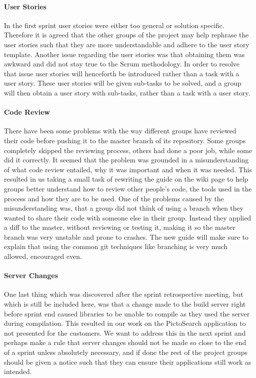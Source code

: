 \paragraph{User Stories} In the first sprint user stories were either too general or solution specific.
Therefore it is agreed that the other groups of the project may help rephrase the user stories such that they are more understandable and adhere to the user story template.
Another issue regarding the user stories was that obtaining them was awkward and did not stay true to the Scrum methodology.
In order to resolve that issue user stories will henceforth be introduced rather than a task with a user story.
These user stories will be given sub-tasks to be solved, and a group will then obtain a user story with sub-tasks, rather than a task with a user story.

\paragraph{Code Review}
There have been some problems with the way different groups have reviewed their code before pushing it to the master branch of its repository.
Some groups completely skipped the reviewing process, others had done a poor job, while some did it correctly.
It seemed that the problem was grounded in a misunderstanding of what code review entailed, why it was important and when it was needed.
This resulted in us taking a small task of rewriting the guide on the wiki page to help groups better understand how to review other people's code, the tools used in the process and how they are to be used.
One of the problems caused by the misunderstanding was, that a group did not think of using a branch when they wanted to share their code with someone else in their group.
Instead they applied a diff to the master, without reviewing or testing it, making it so the master branch was very unstable and prone to crashes.
The new guide will make sure to explain that using the common git techniques like branching is very much allowed, encouraged even.

\paragraph{Server Changes}
One last thing which was discovered after the sprint retrospective meeting, but which is still be included here, was that a change made to the build server right before sprint end caused libraries to be unable to compile as they used the server during compilation.
This resulted in our work on the PictoSearch application to not presented for the customers.
We want to address this in the next sprint and perhaps make a rule that server changes should not be made so close to the end of a sprint unless absolutely necessary, and if done the rest of the project groups should be given a notice such that they can ensure their applications still work as intended.

